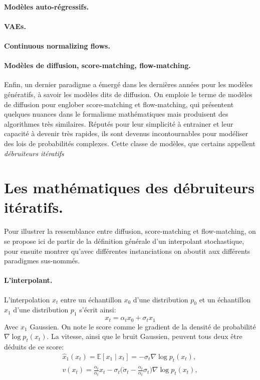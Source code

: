 \documentclass[12pt,a4paper,oneside]{book} %
\begin{document}
\paragraph{Modèles auto-régressifs.}

\paragraph{VAEs.}

\paragraph{Continuous normalizing flows.}

\paragraph{Modèles de diffusion, score-matching, flow-matching.} Enfin, un dernier paradigme a émergé dans les dernières années pour les modèles génératifs, à savoir les modèles dits de diffusion. On emploie le terme de modèles de diffusion pour englober score-matching et flow-matching, qui présentent quelques nuances dans le formalisme mathématiques mais produisent des algorithmes très similaires. Réputés pour leur simplicité à entrainer et leur capacité à devenir très rapides, ils sont devenus incontournables pour modéliser des lois de probabilités complexes. Cette classe de modèles, que certains appellent \textit{débruiteurs itératifs}

\section{Les mathématiques des débruiteurs itératifs.}

Pour illustrer la ressemblance entre diffusion, score-matching et flow-matching, on se propose ici de partir de la définition générale d'un interpolant stochastique, pour ensuite montrer qu'avec différentes instanciations on aboutit aux différents paradigmes sus-nommés.

\paragraph{L'interpolant.} L'interpolation $x_t$ entre un échantillon $x_0$ d'une distribution $p_0$ et un échantillon $x_1$ d'une distribution $p_1$ s'écrit ainsi:
\begin{equation}
    x_t = \alpha_t x_0 + \sigma_t x_1
\end{equation}
Avec $x_1$ Gaussien.
On note le score comme le gradient de la densité de probabilité $\nabla \log p_t(x_t)$.
La vitesse, ainsi que le bruit Gaussien, peuvent tous deux être déduits de ce score:
\begin{gather}
    \hat{x}_1(x_t) = \mathbb{E}\left[x_1 \mid x_t\right] = -\sigma_t \nabla \log p_t(x_t), \\
    v(x_t) = \frac{\dot{\alpha}_t}{\alpha_t} x_t
      - \sigma_t \Big(\dot{\sigma}_t - \frac{\dot{\alpha}_t}{\alpha_t}\sigma_t\Big) \nabla \log p_t(x_t),
\end{gather}
\end{document}
